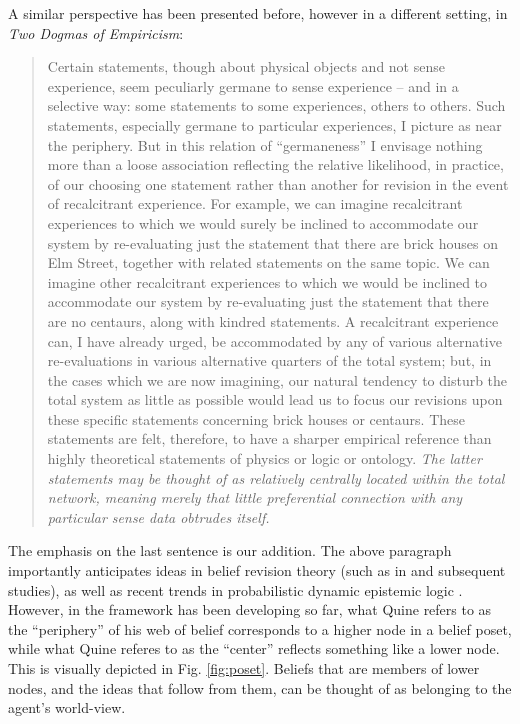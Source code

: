 \documentclass[11pt]{article}
\numberwithin{equation}{subsection}
\begin{document}
A similar perspective has been presented before, however in a
different setting, in \emph{Two Dogmas of Empiricism}:
\begin{quote}
{Certain statements, though about physical objects and not sense
  experience, seem peculiarly germane to sense experience -- and in a
  selective way: some statements to some experiences, others to
  others. Such statements, especially germane to particular
  experiences, I picture as near the periphery. But in this relation
  of ``germaneness'' I envisage nothing more than a loose association
  reflecting the relative likelihood, in practice, of our choosing one
  statement rather than another for revision in the event of
  recalcitrant experience. For example, we can imagine recalcitrant
  experiences to which we would surely be inclined to accommodate our
  system by re-evaluating just the statement that there are brick
  houses on Elm Street, together with related statements on the same
  topic. We can imagine other recalcitrant experiences to which we
  would be inclined to accommodate our system by re-evaluating just
  the statement that there are no centaurs, along with kindred
  statements. A recalcitrant experience can, I have already urged, be
  accommodated by any of various alternative re-evaluations in various
  alternative quarters of the total system; but, in the cases which we
  are now imagining, our natural tendency to disturb the total system
  as little as possible would lead us to focus our revisions upon
  these specific statements concerning brick houses or centaurs. These
  statements are felt, therefore, to have a sharper empirical
  reference than highly theoretical statements of physics or logic or
  ontology. \emph{The latter statements may be thought of as
    relatively centrally located within the total network, meaning
    merely that little preferential connection with any particular
    sense data obtrudes itself.} }\citep{quine_two_1951}
\end{quote}

The emphasis on the last sentence is our addition.  The above paragraph
importantly anticipates ideas in belief revision theory (such as in
\citet{alchourron_logic_1985} and subsequent studies), as well as
recent trends in probabilistic dynamic epistemic logic \citep[such as
in][etc.]{van_benthem_conditional_2003,van_benthem_dynamic_2009,baltag_probabilistic_2008,kooi_probabilistic_2003}.
However, in the framework has been developing so far, what
Quine refers to as the ``periphery'' of his web of belief corresponds
to a higher node in a belief poset, while what Quine referes to as the
``center'' reflects something like a lower node.  This is visually
depicted in Fig. \ref{fig:poset}.  Beliefs that are members of lower
nodes, and the ideas that follow from them, can be thought of as
belonging to the agent's world-view.
\end{document}
